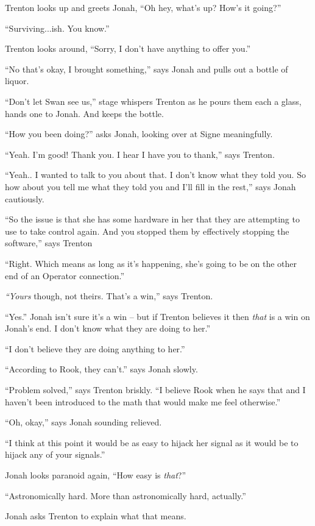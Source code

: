Trenton looks up and greets Jonah, ``Oh hey, what's up?  How's it going?''

``Surviving...ish.  You know.''

Trenton looks around, ``Sorry, I don't have anything to offer you.''

``No that's okay, I brought something,'' says Jonah and pulls out a bottle of liquor.  

``Don't let Swan see us,'' stage whispers Trenton as he pours them each a glass, hands one to Jonah.  And keeps the bottle.

``How you been doing?'' asks Jonah, looking over at Signe meaningfully.

``Yeah.  I'm good!  Thank you.  I hear I have you to thank,'' says Trenton.

``Yeah.. I wanted to talk to you about that.  I don't know what they told you.  So how about you tell me what they told you and I'll fill in the rest,'' says Jonah cautiously.

``So the issue is that she has some hardware in her that they are attempting to use to take control again.  And you stopped them by effectively stopping the software,'' says Trenton

``Right.  Which means as long as it's happening, she's going to be on the other end of an Operator connection.''

\textit{``Yours} though, not theirs.  That's a win,'' says Trenton.

``Yes.''  Jonah isn't sure it's a win -- but if Trenton believes it then \textit{that} is a win on Jonah's end.  I don't know what they are doing to her.''

``I don't believe they are doing anything to her.''

``According to Rook, they can't.'' says Jonah slowly.

``Problem solved,'' says Trenton briskly.  ``I believe Rook when he says that and I haven't been introduced to the math that would make me feel otherwise.''

``Oh, okay,'' says Jonah sounding relieved.

``I think at this point it would be as easy to hijack her signal as it would be to hijack any of your signals.''

Jonah looks paranoid again, ``How easy is \textit{that}?''

``Astronomically hard.  More than astronomically hard, actually.''

Jonah asks Trenton to explain what that means.

